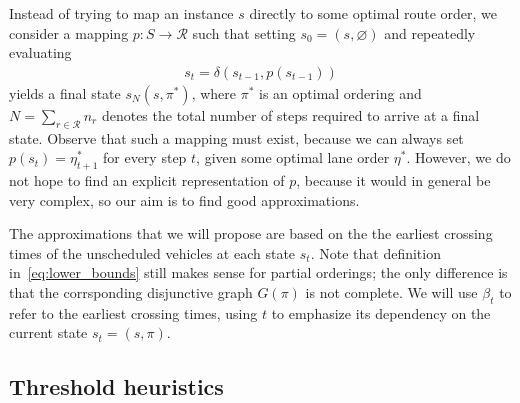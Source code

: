 \documentclass[a4paper]{article}
\theoremstyle{definition}
\theoremstyle{plain}
\begin{document}
Instead of trying to map an instance $s$ directly to some optimal route order, we consider
a mapping $p : S \rightarrow \mathcal{R}$ such that setting $s_{0} = (s, \varnothing)$ and repeatedly
evaluating
\begin{align*}
  s_{t} = \delta(s_{t-1}, p(s_{t-1}))
\end{align*}
yields a final state $s_{N}(s, \pi^{*})$, where $\pi^{*}$ is an optimal ordering and
$N = \sum_{r \in \mathcal{R}} n_{r}$ denotes the total number of steps required
to arrive at a final state.
%
Observe that such a mapping must exist, because we can always set
$p(s_{t}) = \eta^{*}_{t+1}$ for every step $t$, given some optimal lane order
$\eta^{*}$. However, we do not hope to find an explicit representation of $p$,
because it would in general be very complex, so our aim is to find good
approximations.

The approximations that we will propose are based on the the earliest crossing
times of the unscheduled vehicles at each state $s_{t}$. Note that definition
in~\eqref{eq:lower_bounds} still makes sense for partial orderings; the only
difference is that the corrsponding disjunctive graph $G(\pi)$ is not complete.
We will use $\beta_{t}$ to refer to the earliest crossing times,
using $t$ to emphasize its dependency on the current state $s_{t} = (s, \pi)$.


\subsection{Threshold heuristics}
\end{document}
